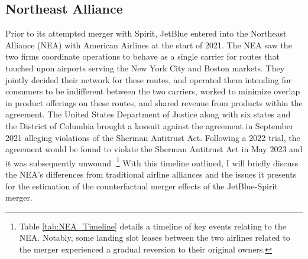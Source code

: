 \documentclass{article}
\begin{document}
    	
	\subsection{Northeast Alliance}
	\label{sec:Setting_NEA}
	
	Prior to its attempted merger with Spirit, JetBlue entered into the Northeast Alliance (NEA) with American Airlines at the start of 2021. The NEA saw the two firms coordinate operations to behave as a single carrier for routes that touched upon airports serving the New York City and Boston markets. They jointly decided their network for these routes, and operated them intending for consumers to be indifferent between the two carriers, worked to minimize overlap in product offerings on these routes, and shared revenue from products within the agreement. The United States Department of Justice along with six states and the District of Columbia brought a lawsuit against the agreement in September 2021 alleging violations of the Sherman Antitrust Act. Following a 2022 trial, the agreement would be found to violate the Sherman Antitrust Act in May 2023 and it was subsequently unwound \citep{rennison_jetblue-american_2023, rains_what_2023}.\footnote{Table \ref{tab:NEA_Timeline} details a timeline of key events relating to the NEA. Notably, some landing slot leases between the two airlines related to the merger experienced a gradual reversion to their original owners.} With this timeline outlined, I will briefly discuss the NEA's differences from traditional airline alliances and the issues it presents for the estimation of the counterfactual merger effects of the JetBlue-Spirit merger. 
\end{document}
